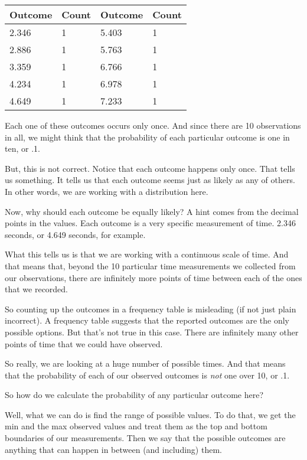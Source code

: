 \documentclass[../../../main.tex]{subfiles}
\begin{document}
\begin{center}
  \begin{tabular}{|| l | l || l | l |}
    \hline
    \textbf{Outcome} & \textbf{Count} & \textbf{Outcome} & \textbf{Count}  \\ \hline
    2.346 & 1 & 5.403 & 1 \\ \hline
    2.886 & 1 & 5.763 & 1 \\ \hline
    3.359 & 1 & 6.766 & 1 \\ \hline
    4.234 & 1 & 6.978 & 1 \\ \hline
    4.649 & 1 & 7.233 & 1 \\ \hline
  \end{tabular}
\end{center}

Each one of these outcomes occurs only once. And since there are 10 observations in all, we might think that the probability of each particular outcome is one in ten, or .1.

But, this is not correct. Notice that each outcome happens only once. That tells us something. It tells us that each outcome seems just as likely as any of others. In other words, we are working with a  distribution here.

Now, why should each outcome be equally likely? A hint comes from the decimal points in the values. Each outcome is a very specific measurement of time. 2.346 seconds, or 4.649 seconds, for example. 

What this tells us is that we are working with a continuous scale of time. And that means that, beyond the 10 particular time measurements we collected from our observations, there are infinitely more points of time between each of the ones that we recorded.

So counting up the outcomes in a frequency table is misleading (if not just plain incorrect). A frequency table suggests that the reported outcomes are the only possible options. But that's not true in this case. There are infinitely many other points of time that we could have observed.

So really, we are looking at a huge number of possible times. And that means that the probability of each of our observed outcomes is \emph{not} one over 10, or .1.

So how do we calculate the probability of any particular outcome here?

Well, what we can do is find the range of possible values. To do that, we get the min and the max observed values and treat them as the top and bottom boundaries of our measurements. Then we say that the possible outcomes are anything that can happen in between (and including) them.
\end{document}
